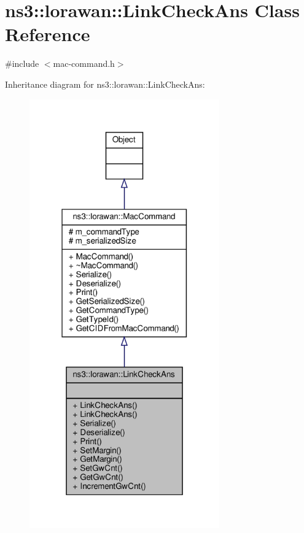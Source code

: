 \hypertarget{classns3_1_1lorawan_1_1LinkCheckAns}{}\section{ns3\+:\+:lorawan\+:\+:Link\+Check\+Ans Class Reference}
\label{classns3_1_1lorawan_1_1LinkCheckAns}


{\ttfamily \#include $<$mac-\/command.\+h$>$}



Inheritance diagram for ns3\+:\+:lorawan\+:\+:Link\+Check\+Ans\+:
\nopagebreak
\begin{figure}[H]
\begin{center}
\leavevmode
\includegraphics[width=232pt]{classns3_1_1lorawan_1_1LinkCheckAns__inherit__graph}
\end{center}
\end{figure}


